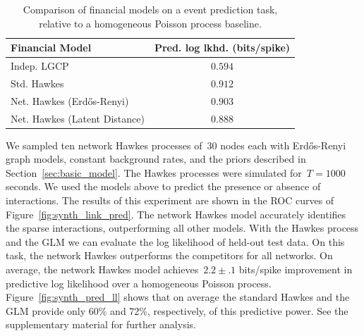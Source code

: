 \begin{table}
  \begin{center}
    \begin{tabular}{l|c}
      \textbf{Financial Model} & \textbf{Pred. log lkhd. (bits/spike)} \\
      \hline
      Indep. LGCP & $0.594$ \\
      Std. Hawkes & $0.912$ \\
      Net. Hawkes (Erd\H{o}s-Renyi) & $0.903$ \\
      Net. Hawkes (Latent Distance) & $0.888$ \\
    \end{tabular}
  \end{center}
    \caption{Comparison of financial models on a event prediction task, relative to a homogeneous Poisson process baseline.}
    \label{tab:financial_pred_ll}
\end{table}

We sampled ten network Hawkes processes of~$30$ nodes each with
Erd\H{o}s-Renyi graph models, constant background rates, and the
priors described in Section~\ref{sec:basic_model}. The Hawkes
processes were simulated for~${T=1000}$ seconds. We used the models
above to predict the presence or absence of interactions. The results
of this experiment are shown in the ROC curves of
Figure~\ref{fig:synth_link_pred}. The network Hawkes model accurately
identifies the sparse interactions, outperforming all other models.
With the Hawkes process and the GLM we can evaluate the log likelihood
of held-out test data. On this task, the network Hawkes outperforms
the competitors for all networks. On average, the network Hawkes model
achieves~$2.2\pm.1$ bits/spike improvement in predictive log
likelihood over a homogeneous Poisson
process. Figure~\ref{fig:synth_pred_ll} shows that on average the
standard Hawkes and the GLM provide only 60\% and 72\%, respectively,
of this predictive power. See the supplementary material for further
analysis.

